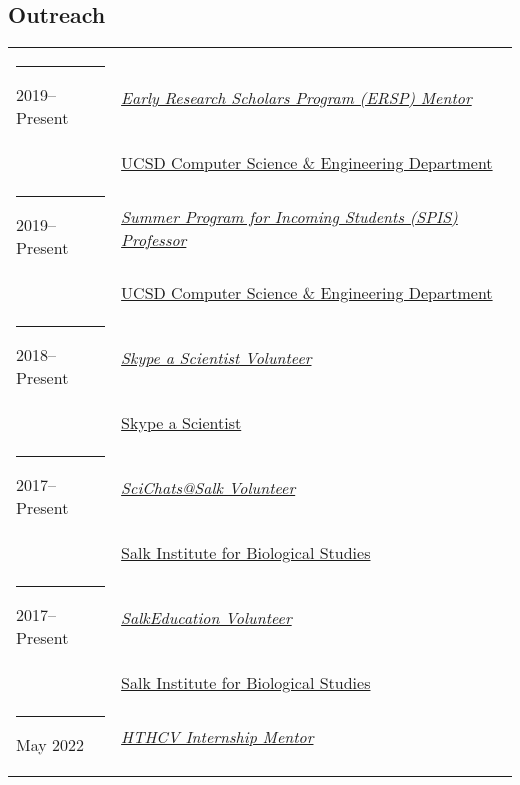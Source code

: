 \documentclass[margin,line]{res}
\begin{document}
\begin{resume}
\section{\sc Outreach}
\begin{longtable}{@{}p{0.7in}p{4in}}\rule{-1mm}{4.5mm}
\hspace*{-4mm} 2019--Present & \href{http://ersp.ucsd.edu/}{\textit{Early Research Scholars Program (ERSP) Mentor}}\\*
\hspace*{-4mm} & \hspace{4mm} \href{http://cse.ucsd.edu}{UCSD Computer Science \& Engineering Department}\\
\hspace*{-4mm} \rule{-1mm}{5mm} 2019--Present & \href{https://sites.google.com/a/eng.ucsd.edu/spis}{\textit{Summer Program for Incoming Students (SPIS) Professor}}\\*
\hspace*{-4mm} & \hspace{4mm} \href{http://cse.ucsd.edu}{UCSD Computer Science \& Engineering Department}\\
\hspace*{-4mm} \rule{-1mm}{5mm} 2018--Present & \href{https://www.skypeascientist.com/}{\textit{Skype a Scientist Volunteer}}\\*
\hspace*{-4mm} & \hspace{4mm} \href{https://www.skypeascientist.com/}{Skype a Scientist}\\
\hspace*{-4mm} \rule{-1mm}{5mm} 2017--Present & \href{http://education.salk.edu/scientist-profile-niema-moshiri/}{\textit{SciChats@Salk Volunteer}}\\*
\hspace*{-4mm} & \hspace{4mm} \href{https://www.salk.edu/}{Salk Institute for Biological Studies}\\
\hspace*{-4mm} \rule{-1mm}{5mm} 2017--Present & \href{https://www.salk.edu/about/education-outreach/}{\textit{SalkEducation Volunteer}}\\*
\hspace*{-4mm} & \hspace{4mm} \href{https://www.salk.edu/}{Salk Institute for Biological Studies}\\
\hspace*{-4mm} \rule{-1mm}{5mm} May 2022 & \href{http://web.hightechhigh.org/internships/}{\textit{HTHCV Internship Mentor}}\\*

\end{longtable}
\end{resume}
\end{document}
